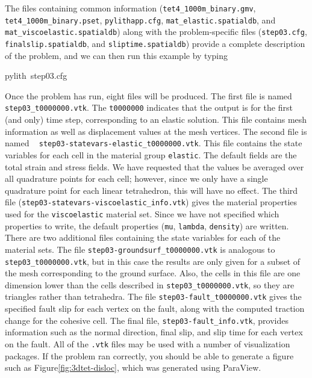 The files containing common information (\texttt{\small{}tet4\_1000m\_binary.gmv}{\small{},
}\texttt{\small{}tet4\_1000m\_binary.pset}{\small{}, }\texttt{\small{}pylithapp.cfg}{\small{},
}\texttt{\small{}mat\_elastic.spatialdb}, and \texttt{mat\_viscoelastic.spatialdb})
along with the problem-specific files (\texttt{\small{}step03.cfg}{\small{},
}\texttt{\small{}finalslip.spatialdb}{\small{}, and }\texttt{\small{}sliptime.spatialdb})
provide a complete description of the problem, and we can then run
this example by typing
\begin{lyxcode}
pylith~step03.cfg
\end{lyxcode}
Once the problem has run, eight files will be produced. The first
file is named \texttt{step03\_t0000000.vtk}. The \texttt{t0000000}
indicates that the output is for the first (and only) time step, corresponding
to an elastic solution. This file contains mesh information as well
as displacement values at the mesh vertices. The second file is named
\texttt{}~\linebreak{}
\texttt{step03-statevars-elastic\_t0000000.vtk}. This file contains
the state variables for each cell in the material group \texttt{elastic}.
The default fields are the total strain and stress fields. We have
requested that the values be averaged over all quadrature points for
each cell; however, since we only have a single quadrature point for
each linear tetrahedron, this will have no effect. The third file
(\texttt{step03-statevars-viscoelastic\_info.vtk}) gives the material
properties used for the \texttt{viscoelastic} material set. Since
we have not specified which properties to write, the default properties
(\texttt{mu}, \texttt{lambda}, \texttt{density}) are written. There
are two additional files containing the state variables for each of
the material sets. The file \texttt{step03-groundsurf\_t0000000.vtk}
is analogous to \texttt{step03\_t0000000.vtk}, but in this case the
results are only given for a subset of the mesh corresponding to the
ground surface. Also, the cells in this file are one dimension lower
than the cells described in \texttt{step03\_t0000000.vtk}, so they
are triangles rather than tetrahedra. The file \texttt{step03-fault\_t0000000.vtk}
gives the specified fault slip for each vertex on the fault, along
with the computed traction change for the cohesive cell. The final
file, \texttt{step03-fault\_info.vtk}, provides information such as
the normal direction, final slip, and slip time for each vertex on
the fault. All of the \texttt{.vtk} files may be used with a number
of visualization packages. If the problem ran correctly, you should
be able to generate a figure such as Figure\vref{fig:3dtet-disloc},
which was generated using ParaView.

